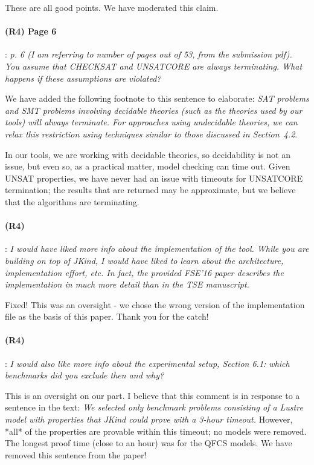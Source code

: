 \documentclass{article}
\begin{document}
These are all good points.  We have moderated this claim.

\paragraph{(R4) Page 6}: \textit{p. 6 (I am referring to number of pages out of 53, from the submission pdf). You assume that CHECKSAT and UNSATCORE are
always terminating. What happens if these assumptions are violated?}
\vspace{0.05in}

\noindent We have added the following footnote to this sentence to elaborate: \textit{SAT problems and SMT problems involving decidable theories (such as the theories used by our tools) will always terminate.  For approaches using undecidable theories, we can relax this restriction using  techniques similar to those discussed in Section~4.2}.

In our tools, we are working with decidable theories, so decidability is not an issue, but even so, as a practical matter, model checking can time out.  Given UNSAT properties, we have never had an issue with timeouts for UNSATCORE termination; the results that are returned may be approximate, but we believe that the algorithms are terminating.

\paragraph{(R4)}: \textit{I would have liked more info about the implementation of the tool. While you are building on top of JKind, I would have liked to learn about the architecture, implementation effort, etc. In fact, the provided FSE'16 paper describes the implementation in much more detail than in the TSE manuscript.}
\vspace{0.05in}

Fixed!  This was an oversight - we chose the wrong version of the implementation file as the basis of this paper.  Thank you for the catch!

\paragraph{(R4)}: \textit{I would also like more info about the experimental setup, Section 6.1: which benchmarks did you exclude then and why?}
\vspace{0.05in}

This is an oversight on our part.  I believe that this comment is in response to a sentence in the text: \textit{We selected only benchmark problems consisting of a Lustre model with properties that JKind could prove with a 3-hour timeout.}  However, *all* of the properties are provable within this timeout; no models were removed.  The longest proof time (close to an hour) was for the QFCS models.  We have removed this sentence from the paper!
\end{document}
